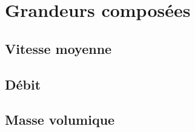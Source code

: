 \section{Grandeurs composées}
\subsection{Vitesse moyenne}




\subsection{Débit}

\subsection{Masse volumique}
